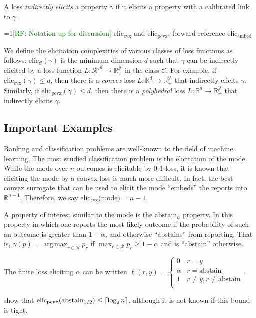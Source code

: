 \documentclass[anon,12pt]{colt2019}
\newcommand{\Comments}{1}
\newcommand{\mynote}[2]{\ifnum\Comments=1\textcolor{#1}{#2}\fi}
\newcommand{\raf}[1]{\mynote{green}{[RF: #1]}}
\newcommand{\reals}{\mathbb{R}}
\newcommand{\eliccvx}{\mathrm{elic}_\mathrm{cvx}}
\newcommand{\elicpoly}{\mathrm{elic}_\mathrm{pcvx}}
\newcommand{\elicembed}{\mathrm{elic}_\mathrm{embed}}
\newcommand{\abstain}[1]{\mathrm{abstain}_{#1}}
\newcommand{\C}{\mathcal{C}}
\newcommand{\R}{\mathcal{R}}
\newcommand{\Y}{\mathcal{Y}}
\DeclarePairedDelimiter\ceil{\lceil}{\rceil}
\DeclareMathOperator*{\argmax}{arg\,max}
\begin{document}
\begin{definition}
  A loss \emph{indirectly elicits} a property $\gamma$ if it elicits a property with a calibrated link to $\gamma$.
\end{definition}

\raf{Notation up for discussion}
$\eliccvx$ and $\elicpoly$; forward reference $\elicembed$

We define the elicitation complexities of various classes of loss functions as follows: elic$_\C(\gamma)$ is the minimum dimension $d$ such that $\gamma$ can be indirectly elicited by a loss function $L: \R'^d \to \reals^\Y_+$ in the class $\C$.
For example, if $\eliccvx(\gamma) \leq d$, then there is a \emph{convex} loss $L:\reals^d \to \reals^\Y_+$ that indirectly elicits $\gamma$.
Similarly, if $\elicpoly(\gamma) \leq d$, then there is a \emph{polyhedral} loss $L:\reals^d \to \reals^\Y_+$ that indirectly elicits $\gamma$.

\subsection{Important Examples}
  Ranking and classification problems are well-known to the field of machine learning.
  The most studied classification problem is the elicitation of the mode.
  While the mode over $n$ outcomes is elicitable by 0-1 loss, it is known that eliciting the mode by a convex loss is much more difficult.
  In fact, the best convex surrogate that can be used to elicit the mode ``embeds'' the reports into $\reals^{n-1}$.
  Therefore, we say $\eliccvx($mode$) = n-1$.

  A property of interest similar to the mode is the $\abstain{\alpha}$ property.
  In this property in which one reports the most likely outcome if the probability of such an outcome is greater than $1-\alpha$, and otherwise ``abstains'' from reporting.
  That is, $\gamma(p) = \argmax_{r \in \R}p_r$ if $\max_{r \in \R} p_r \geq 1-\alpha$ and is ``abstain'' otherwise.

  The finite loss eliciting $\alpha$ can be written
  $\ell(r,y) = \begin{cases}
  0 & r = y\\
  \alpha & r = \text{abstain}\\
  1 & r \neq y, r \neq \text{abstain}\\
  \end{cases}$.

\cite{ramaswamy2018consistent} show that $\elicpoly(\abstain{1/2}) \leq \ceil{\log_2 n}$, although it is not known if this bound is tight.
\end{document}
